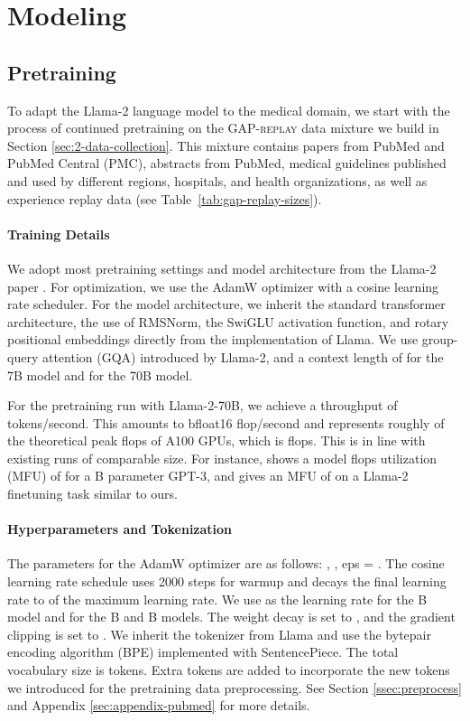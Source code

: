 \documentclass{article}
\newcommand{\llama}{\textnormal{Llama}}
\begin{document}
\section{Modeling}


\subsection{Pretraining}
To adapt the \llama-2 \citep{llama2} language model to the medical domain, we start with the process of continued pretraining on the \textsc{GAP-replay} data mixture we build in Section \ref{sec:2-data-collection}. This mixture contains papers from PubMed and PubMed Central (PMC), abstracts from PubMed, medical guidelines published and used by different regions, hospitals, and health organizations, as well as experience replay data (see Table~\ref{tab:gap-replay-sizes}).

\paragraph{Training Details}
We adopt most pretraining settings and model architecture from the \llama-2 paper \citep{llama2}. For optimization, we use the AdamW optimizer with a cosine learning rate scheduler. For the model architecture, we inherit the standard transformer architecture, the use of RMSNorm, the SwiGLU activation function, and rotary positional embeddings directly from the implementation of \llama. We use group-query attention (GQA) introduced by \llama-2, and a context length of  for the 7B model and  for the 70B model. 

For the pretraining run with \llama-2-70B, we achieve a throughput of  tokens/second. This amounts to  bfloat16 flop/second and represents roughly  of the theoretical peak flops of  A100 GPUs, which is  flops. This is in line with existing runs of comparable size. For instance, \citet[Table 1]{Narayanan2021} shows a model flops utilization (MFU) of  for a B parameter GPT-3, and \citet{Mangrulkar2023} gives an MFU of  on a \llama-2 finetuning task similar to ours. 

\paragraph{Hyperparameters and Tokenization}
The parameters for the AdamW optimizer are as follows: , , eps = . The cosine learning rate schedule uses 2000 steps for warmup and decays the final learning rate to  of the maximum learning rate. We use  as the learning rate for the B model and  for the B and B models. The weight decay is set to , and the gradient clipping is set to . We inherit the tokenizer from \llama{} and use the bytepair encoding algorithm (BPE) implemented with SentencePiece. The total vocabulary size is  tokens. Extra tokens are added to incorporate the new tokens we introduced for the pretraining data preprocessing. See Section \ref{ssec:preprocess} and Appendix \ref{sec:appendix-pubmed} for more details.
\end{document}
